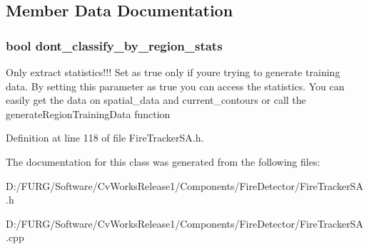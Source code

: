 \subsection{Member Data Documentation}
\hypertarget{class_fire_tracker_s_a_abc9326cea4683208d23aa1854bf6cd89}{}
\subsubsection[{dont\+\_\+classify\+\_\+by\+\_\+region\+\_\+stats}]{\setlength{\rightskip}{0pt plus 5cm}bool dont\+\_\+classify\+\_\+by\+\_\+region\+\_\+stats}\label{class_fire_tracker_s_a_abc9326cea4683208d23aa1854bf6cd89}
Only extract statistics!!! Set as true only if you\textquotesingle{}re trying to generate training data. By setting this parameter as true you can access the statistics. You can easily get the data on \textquotesingle{}spatial\+\_\+data\textquotesingle{} and \textquotesingle{}current\+\_\+contours\textquotesingle{} or call the \textquotesingle{}generate\+Region\+Training\+Data\textquotesingle{} function 

Definition at line 118 of file Fire\+Tracker\+S\+A.\+h.



The documentation for this class was generated from the following files\+:\begin{DoxyCompactItemize}
\item 
D\+:/\+F\+U\+R\+G/\+Software/\+Cv\+Works\+Release1/\+Components/\+Fire\+Detector/Fire\+Tracker\+S\+A.\+h\item 
D\+:/\+F\+U\+R\+G/\+Software/\+Cv\+Works\+Release1/\+Components/\+Fire\+Detector/Fire\+Tracker\+S\+A.\+cpp\end{DoxyCompactItemize}
